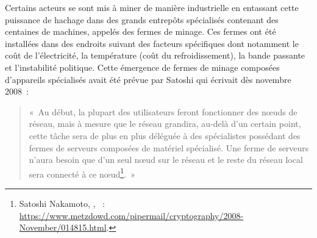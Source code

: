 
Certains acteurs se sont mis à miner de manière industrielle en entassant cette puissance de hachage dans des grands entrepôts spécialisés contenant des centaines de machines, appelés des fermes de minage. Ces fermes ont été installées dans des endroits suivant des facteurs spécifiques dont notamment le coût de l'électricité, la température (coût du refroidissement), la bande passante et l'instabilité politique. Cette émergence de fermes de minage composées d'appareils spécialisés avait été prévue par Satoshi qui écrivait dès novembre 2008~:

\begin{quote}
«~Au début, la plupart des utilisateurs feront fonctionner des nœuds de réseau, mais à mesure que le réseau grandira, au-delà d'un certain point, cette tâche sera de plus en plus déléguée à des spécialistes possédant des fermes de serveurs composées de matériel spécialisé. Une ferme de serveurs n'aura besoin que d'un seul nœud sur le réseau et le reste du réseau local sera connecté à ce nœud\footnote{Satoshi Nakamoto, , ~: \url{https://www.metzdowd.com/pipermail/cryptography/2008-November/014815.html}.}.~»
\end{quote}


